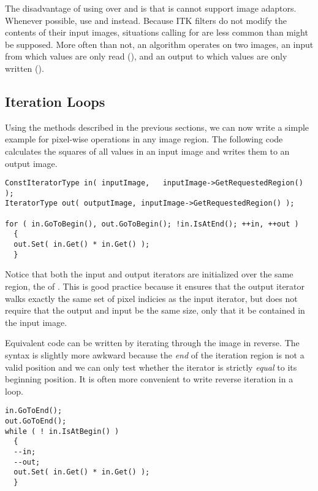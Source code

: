 The disadvantage of using  over  and  is
that is cannot support image adaptors. Whenever possible, use  and
 instead.  Because ITK filters do not modify the contents of their
input images, situations calling for  are less common than might
be supposed. More often than not, an algorithm operates on two images, an
input from which values are only read (), and an output to which
values are only written ().

\subsection{Iteration Loops}
\label{sec:IterationExample}
Using the methods described in the previous sections, we can now write a simple
example for pixel-wise operations in any image region.  The following code
calculates the squares of all values in an input image and writes them to an
output image.

\small
\begin{verbatim}
ConstIteratorType in( inputImage,   inputImage->GetRequestedRegion() );
IteratorType out( outputImage, inputImage->GetRequestedRegion() );

for ( in.GoToBegin(), out.GoToBegin(); !in.IsAtEnd(); ++in, ++out )
  {
  out.Set( in.Get() * in.Get() );
  }
\end{verbatim}
\normalsize

Notice that both the input and output iterators are initialized over the same
region, the  of .  This is good
practice because it ensures that the output iterator walks exactly the same set
of pixel indicies as the input iterator, but does not require that the output
and input be the same size, only that it be contained in the input image.

Equivalent code can be written by iterating through the image in reverse.
The syntax is slightly more awkward because the \emph{end} of the
iteration region is not a valid position and we can only test whether the
iterator is strictly \emph{equal} to its beginning position.  It is often more
convenient to write reverse iteration in a
 loop.

\small
\begin{verbatim}
in.GoToEnd();
out.GoToEnd();
while ( ! in.IsAtBegin() )
  {
  --in;
  --out;
  out.Set( in.Get() * in.Get() );
  }
\end{verbatim}
\normalsize

